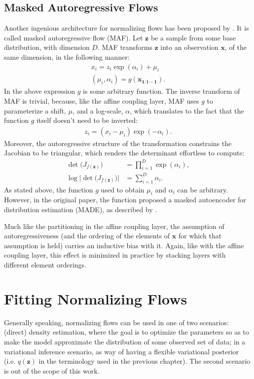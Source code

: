 \subsection{Masked Autoregressive Flows}
Another ingenious architecture for normalizing flows has been proposed by \textcite{maf}.
It is called masked autoregressive flow (MAF). Let $\bm{z}$ be a sample from
some base distribution, with dimension $D$. MAF transforms $\bm{z}$ into an
observation $\bm{x}$, of the same dimension, in the following manner:
\begin{align}
x_i = z_i \exp(\alpha_i) + \mu_i \\
(\mu_i, \alpha_i) = g(\bm{x_{1:i-1}}).
\end{align}
In the above expression $g$ is some arbitrary function. The inverse transform of
MAF is trivial, because, like the affine coupling layer, MAF uses $g$ to parameterize
a shift, $\mu$, and a log-scale, $\alpha$, which translates to the fact that the
function $g$ itself doesn't need to be inverted:
\begin{align}
z_i = (x_i - \mu_i)\exp(-\alpha_i).
\end{align}
Moreover, the autoregressive structure of the transformation constrains the
Jacobian to be triangular, which renders the determinant effortless to compute: 
\begin{align}
\det\big( J_{f(\bm{z})} \big) &= \prod_{i=1}^{D} \exp(\alpha_i), \\
\log \Big| \det \big( J_{f(\bm{z})} \big) \Big| &= \sum_{i=1}^{D} \alpha_i.
\end{align}
As stated above, the function $g$ used to obtain $\mu_i$ and $\alpha_i$ can be
arbitrary. However, in the original paper, the function proposed a masked
autoencoder for distribution estimation (MADE), as described by \textcite{MADE}.

Much like the partitioning in the affine coupling layer, the assumption of
autoregressiveness (and the ordering of the elements of $\bm{x}$
for which that assumption is held) carries an inductive bias with it. Again,
like with the affine coupling layer, this effect is minimized in practice by
stacking layers with different element orderings.

\section{Fitting Normalizing Flows}

Generally speaking, normalizing flows can be used in one of two scenarios:
(direct) density estimation, where the goal is to optimize the parameters
so as to make the model approximate the distribution of some observed set of data;
in a variational inference scenario, as way of having a flexible variational
posterior (i.e. $q(\bm{z})$ in the terminology used in the previous chapter). The
second scenario is out of the scope of this work.

